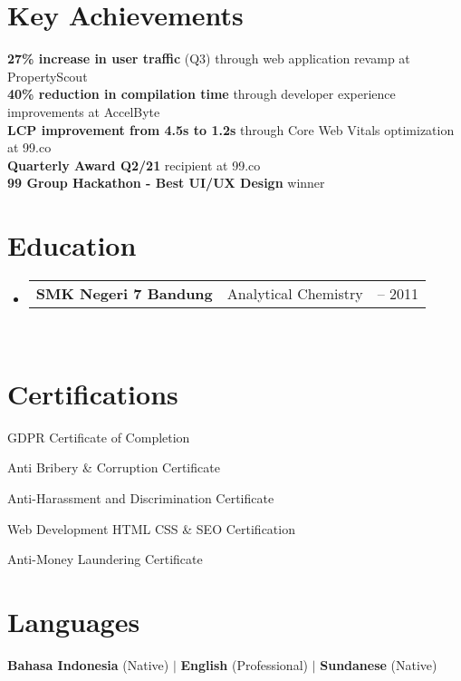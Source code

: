 \documentclass[a4paper, 11pt]{article}
\newcommand{\resumeSubheading}[4]{
  \vspace{-2pt}\item
    \begin{tabularx}{0.987\textwidth}[t]{
  >{\raggedright\arraybackslash}X
  >{\centering\arraybackslash}X
  >{\raggedleft\arraybackslash}X }
      \textbf{#1} & #2 & #3 \\
    \end{tabularx}
    \textit{\small#4}\\
    \vspace{-7pt}
}
\newcommand{\resumeSubHeadingListStart}{\begin{itemize}[leftmargin=0.1in, label={}]}
\newcommand{\resumeSubHeadingListEnd}{\end{itemize}\vspace{5pt}}
\begin{document}
\section{Key Achievements}
\begin{itemize}[leftmargin=0.1in, label=$\bullet$]
    \small{\item{
        \textbf{27\% increase in user traffic} (Q3) through web application revamp at PropertyScout \\
        \textbf{40\% reduction in compilation time} through developer experience improvements at AccelByte \\
        \textbf{LCP improvement from 4.5s to 1.2s} through Core Web Vitals optimization at 99.co \\
        \textbf{Quarterly Award Q2/21} recipient at 99.co \\
        \textbf{99 Group Hackathon - Best UI/UX Design} winner
    }}
\end{itemize}

\section{Education}
    \resumeSubHeadingListStart
        \resumeSubheading
            {SMK Negeri 7 Bandung}{Analytical Chemistry}{2009 -- 2011}
            {}
    \resumeSubHeadingListEnd

\section{Certifications}
\begin{itemize}[leftmargin=0.1in, label=$\bullet$]
    \small{
        \item GDPR Certificate of Completion
        \item Anti Bribery \& Corruption Certificate
        \item Anti-Harassment and Discrimination Certificate
        \item Web Development HTML CSS \& SEO Certification
        \item Anti-Money Laundering Certificate
    }
\end{itemize}

\section{Languages}
\begin{itemize}[leftmargin=0.1in, label={}]
    \small{\item{
        \textbf{Bahasa Indonesia} (Native) $|$ \textbf{English} (Professional) $|$ \textbf{Sundanese} (Native)
    }}
\end{itemize}
\end{document}
